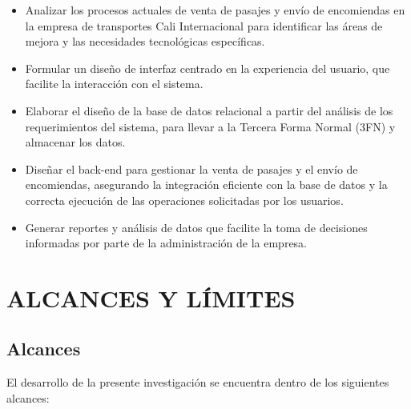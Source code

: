 		\begin{itemize}[label=$\bullet$, left=0cm, labelsep = 1.05cm, topsep = 0pt, parsep = 0pt]
			
			\item Analizar los procesos actuales de venta de pasajes y envío de encomiendas en la empresa de transportes Cali Internacional para identificar las áreas de mejora y las necesidades tecnológicas específicas.
			\item Formular un diseño de interfaz centrado en la experiencia del usuario, que facilite la interacción con el sistema.
			\item Elaborar el diseño de la base de datos relacional a partir del análisis de los requerimientos del sistema, para llevar a la Tercera Forma Normal (3FN) y almacenar los datos.
			\item Diseñar el back-end para gestionar la venta de pasajes y el envío de encomiendas, asegurando la integración eficiente con la base de datos y la correcta ejecución de las operaciones solicitadas por los usuarios.    
			\item Generar reportes y análisis de datos que facilite la toma de decisiones informadas por parte de la administración de la empresa.
			
		\end{itemize}
		
\section{ALCANCES Y LÍMITES}
	\subsection{Alcances}
		
		El desarrollo de la presente investigación se encuentra dentro de los siguientes alcances:
		
